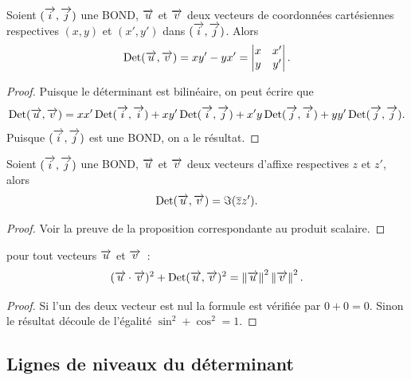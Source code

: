 \begin{prop}
  Soient \((\vi , \vj)\) une BOND, \(\vu\) et \(\vv\) deux vecteurs de
  coordonnées cartésiennes respectives \((x , y)\) et \((x',y')\) dans \((\vi ,
  \vj)\). Alors
  \begin{equation}
    \Det(\vu , \vv) = xy'-yx' = \begin{vmatrix} x&x'\\y&y'\end{vmatrix}.
  \end{equation}
\end{prop}

\begin{proof}
  Puisque le déterminant est bilinéaire, on peut écrire que
  \begin{equation}
    \Det(\vu , \vv) = xx' \Det(\vi , \vi) + xy' \Det(\vi , \vj) + x'y\Det(\vj ,
    \vi) + yy'\Det(\vj , \vj).
  \end{equation}
  Puisque \((\vi , \vj)\) est une BOND, on a le résultat.
\end{proof}

\begin{prop}
  Soient \((\vi , \vj)\) une BOND, \(\vu\) et \(\vv\) deux vecteurs d'affixe
  respectives \(z\) et \(z'\), alors
  \begin{equation}
    \Det(\vu , \vv) = \Im(\bar{z}z').
  \end{equation}
\end{prop}

\begin{proof}
  Voir la preuve de la proposition correspondante au produit scalaire.
\end{proof}

\begin{prop}
  pour tout vecteurs \(\vu\) et \(\vv\)~:
  \begin{equation}
    (\vu \cdot \vv)^2 + \Det(\vu , \vv)^2 = \norme{\vu}^2 \norme{\vv}^2.
  \end{equation}
\end{prop}

\begin{proof}
  Si l'un des deux vecteur est nul la formule est vérifiée par \(0 + 0 = 0\).
  Sinon le résultat découle de l'égalité \(\sin^2 + \cos^2 = 1\).
\end{proof}

\subsection{Lignes de niveaux du déterminant}

